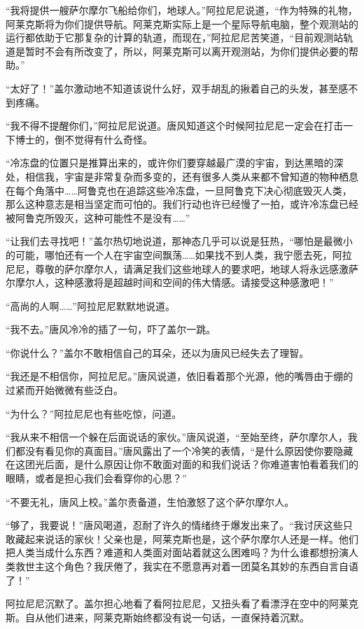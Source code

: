 “我将提供一艘萨尔摩尔飞船给你们，地球人。”阿拉尼尼说道，“作为特殊的礼物，阿莱克斯将为你们提供导航。阿莱克斯实际上是一个星际导航电脑，整个观测站的运行都依助于它那复杂的计算的轨道，而现在，”阿拉尼尼苦笑道，“目前观测站轨道是暂时不会有所改变了，所以，阿莱克斯可以离开观测站，为你们提供必要的帮助。”

“太好了！”盖尔激动地不知道该说什么好，双手胡乱的揪着自己的头发，甚至感不到疼痛。

“我不得不提醒你们，”阿拉尼尼说道。唐风知道这个时候阿拉尼尼一定会在打击一下博士的，倒不觉得有什么奇怪。

“冷冻盘的位置只是推算出来的，或许你们要穿越最广漠的宇宙，到达黑暗的深处，相信我，宇宙是非常复杂而多变的，还有很多人类从来都不曾知道的物种栖息在每个角落中……阿鲁克也在追踪这些冷冻盘，一旦阿鲁克下决心彻底毁灭人类，那么这种意志是相当坚定而可怕的。我们行动也许已经慢了一拍，或许冷冻盘已经被阿鲁克所毁灭，这种可能性不是没有……”

“让我们去寻找吧！”盖尔热切地说道，那神态几乎可以说是狂热，“哪怕是最微小的可能，哪怕还有一个人在宇宙空间飘荡……如果找不到人类，我宁愿去死，阿拉尼尼，尊敬的萨尔摩尔人，请满足我们这些地球人的要求吧，地球人将永远感激萨尔摩尔人，这种感激将是超越时间和空间的伟大情感。请接受这种感激吧！”

“高尚的人啊……”阿拉尼尼默默地说道。

“我不去。”唐风冷冷的插了一句，吓了盖尔一跳。

“你说什么？”盖尔不敢相信自己的耳朵，还以为唐风已经失去了理智。

“我还是不相信你，阿拉尼尼。”唐风说道，依旧看着那个光源，他的嘴唇由于绷的过紧而开始微微有些泛白。

“为什么？”阿拉尼尼也有些吃惊，问道。

“我从来不相信一个躲在后面说话的家伙。”唐风说道，“至始至终，萨尔摩尔人，我们都没有看见你的真面目。”唐风露出了一个冷笑的表情，“是什么原因使你要隐藏在这团光后面，是什么原因让你不敢面对面的和我们说话？你难道害怕看着我们的眼睛，或者是担心我们会看穿你的心思？”

“不要无礼，唐风上校。”盖尔责备道，生怕激怒了这个萨尔摩尔人。

“够了，我要说！”唐风喝道，忍耐了许久的情绪终于爆发出来了。“我讨厌这些只敢藏起来说话的家伙！父亲也是，阿莱克斯也是，这个萨尔摩尔人还是一样。他们把人类当成什么东西？难道和人类面对面站着就这么困难吗？为什么谁都想扮演人类救世主这个角色？我厌倦了，我实在不愿意再对着一团莫名其妙的东西自言自语了！”

阿拉尼尼沉默了。盖尔担心地看了看阿拉尼尼，又扭头看了看漂浮在空中的阿莱克斯。自从他们进来，阿莱克斯始终都没有说一句话，一直保持着沉默。

